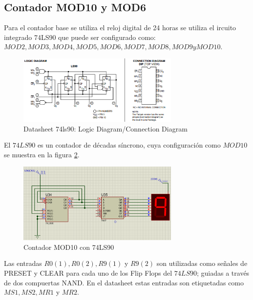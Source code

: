 \subsection{Contador MOD10 y MOD6}
Para el contador base se utiliza el reloj digital de 24 horas se utiliza el ircuito integrado 74LS90 que puede ser configurado como: $MOD2, MOD3, MOD4, MOD5, MOD6, MOD7, MOD8, MOD9 y MOD10$.
\newline
\begin{figure}[h]
    \begin{center}
    \includegraphics[width=8cm]{images/image2.png}
    \newline
    \caption{Datasheet 74ls90: Logic Diagram/Connection Diagram}\label{datasheet_diagram}
    \end{center}
\end{figure}
\newline
El $74LS90$ es un contador de décadas síncrono, cuya configuración como $MOD10$ se muestra en la figura \ref{cont_MOD10}.
\newline
\begin{figure}[h]
    \begin{center}
    \includegraphics[width=8cm]{images/image4.png}
    \newline
    \caption{Contador MOD10 con 74LS90}\label{cont_MOD10}
    \end{center}
\end{figure}
\newline
Las  entradas  $R0(1),  R0(2),  R9(1)$ y $R9(2)$  son  utilizadas  como  señales  de  PRESET  y CLEAR para cada uno de los Flip Flops del $74LS90$; guiadas a través de dos compuertas NAND. En el datasheet estas entradas son etiquetadas como $MS1, MS2, MR1$ y $MR2$. 
\newline
